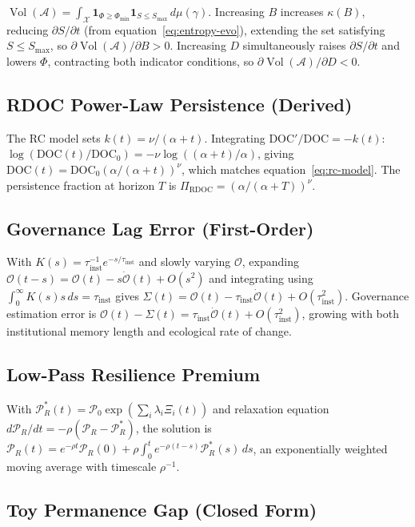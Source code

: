 \documentclass[12pt]{article}
\newcommand{\Xcal}{\mathcal{X}}
\newcommand{\Acal}{\mathcal{A}}
\newcommand{\vol}{\operatorname{Vol}}
\begin{document}
$\vol(\Acal) = \int_\Xcal \mathbf{1}_{\Phi\geq\Phi_\text{min}}\mathbf{1}_{S\leq S_\text{max}}\,d\mu(\gamma)$.
Increasing $B$ increases $\kappa(B)$, reducing $\partial S/\partial t$
(from equation~\eqref{eq:entropy-evo}), extending the set satisfying $S\leq S_\text{max}$,
so $\partial\vol(\Acal)/\partial B>0$.
Increasing $D$ simultaneously raises $\partial S/\partial t$ and lowers $\Phi$,
contracting both indicator conditions, so $\partial\vol(\Acal)/\partial D<0$.

\subsection{RDOC Power-Law Persistence (Derived)}

The RC model sets $k(t)=\nu/(\alpha+t)$. Integrating $\mathrm{DOC}'/\mathrm{DOC}=-k(t)$:
$\log(\mathrm{DOC}(t)/\mathrm{DOC}_0) = -\nu\log((\alpha+t)/\alpha)$,
giving $\mathrm{DOC}(t)=\mathrm{DOC}_0(\alpha/(\alpha+t))^\nu$, which matches
equation~\eqref{eq:rc-model}. The persistence fraction at horizon $T$ is
$\Pi_\text{RDOC}=(\alpha/(\alpha+T))^\nu$.

\subsection{Governance Lag Error (First-Order)}

With $K(s)=\tau_\text{inst}^{-1}e^{-s/\tau_\text{inst}}$ and slowly varying $\mathcal{O}$,
expanding $\mathcal{O}(t-s)=\mathcal{O}(t)-s\dot{\mathcal{O}}(t)+O(s^2)$ and integrating
using $\int_0^\infty K(s)s\,ds=\tau_\text{inst}$ gives
$\Sigma(t) = \mathcal{O}(t) - \tau_\text{inst}\dot{\mathcal{O}}(t) + O(\tau_\text{inst}^2)$.
Governance estimation error is $\mathcal{O}(t)-\Sigma(t) = \tau_\text{inst}\dot{\mathcal{O}}(t)+O(\tau_\text{inst}^2)$,
growing with both institutional memory length and ecological rate of change.

\subsection{Low-Pass Resilience Premium}

With $\mathcal{P}_R^*(t)=\mathcal{P}_0\exp(\sum_i\lambda_i\Xi_i(t))$ and relaxation
equation $d\mathcal{P}_R/dt = -\rho(\mathcal{P}_R-\mathcal{P}_R^*)$, the solution is
$\mathcal{P}_R(t) = e^{-\rho t}\mathcal{P}_R(0) + \rho\int_0^t e^{-\rho(t-s)}\mathcal{P}_R^*(s)\,ds$,
an exponentially weighted moving average with timescale $\rho^{-1}$.

\subsection{Toy Permanence Gap (Closed Form)}
\end{document}
